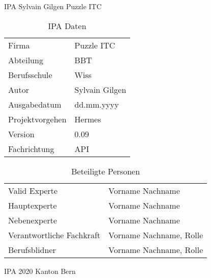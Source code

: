 \begin{titlepage}
    \Huge IPA Sylvain Gilgen Puzzle ITC\normalsize
  \bigbreak
  \begin{table}[h!]
      \begin{tabular}{|L{0.2\textwidth}|L{0.7\textwidth}|}
          \hline
            \\[12pt]
          \hline
          Firma & Puzzle ITC \\
          \hline
          Abteilung & BBT \\
          \hline
          Berufsschule & Wiss \\
          \hline
          Autor & Sylvain Gilgen \\
          \hline
          Ausgabedatum & dd.mm.yyyy \\
          \hline
          Projektvorgehen & Hermes \\
          \hline
          Version & 0.09 \\
          \hline
          Fachrichtung & API \\
          \hline
        \end{tabular}
        \caption{IPA Daten}
  \end{table}
  \begin{table}[!h]
      \begin{tabular}{|L{0.4\textwidth}|L{0.5\textwidth}|}
          \hline
            \\[12pt]
          \hline
          Valid Experte & Vorname Nachname \\
          \hline
          Hauptexperte & Vorname Nachname \\
          \hline
          Nebenexperte & Vorname Nachname \\
          \hline
          Verantwortliche Fachkraft & Vorname Nachname, Rolle \\
          \hline
          Berufsblidner & Vorname Nachname, Rolle \\
          \hline
      \end{tabular}
      \caption{Beteiligte Personen}
  \end{table}
  \Huge IPA 2020 Kanton Bern
  \end{titlepage}